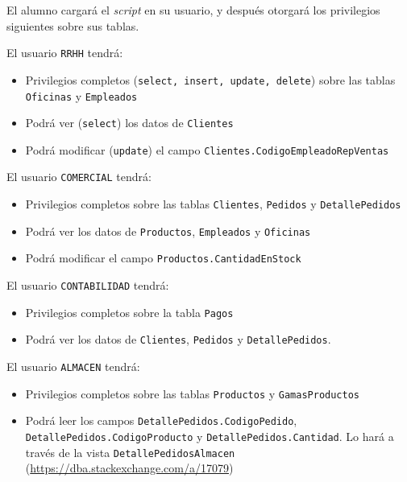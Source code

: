 El alumno cargará el \textit{script} en su usuario, y después otorgará los privilegios siguientes sobre sus tablas.

\begin{homeworkProblem}
  El usuario \texttt{RRHH} tendrá:
  \begin{itemize}
  \item Privilegios completos (\texttt{select, insert, update, delete}) sobre las tablas \texttt{Oficinas} y \texttt{Empleados}
  \item Podrá ver (\texttt{select}) los datos de \texttt{Clientes}
  \item Podrá modificar (\texttt{update}) el campo \texttt{Clientes.CodigoEmpleadoRepVentas}
  \end{itemize}
\end{homeworkProblem}

\begin{homeworkProblem}
  El usuario \texttt{COMERCIAL} tendrá:
  \begin{itemize}
  \item Privilegios completos sobre las tablas \texttt{Clientes}, \texttt{Pedidos} y \texttt{DetallePedidos}
  \item Podrá ver  los datos de \texttt{Productos}, \texttt{Empleados} y \texttt{Oficinas} 
  \item Podrá modificar el campo \texttt{Productos.CantidadEnStock}
  \end{itemize}
\end{homeworkProblem}

\begin{homeworkProblem}
  El usuario \texttt{CONTABILIDAD} tendrá:
  \begin{itemize}
  \item Privilegios completos sobre la tabla \texttt{Pagos}
  \item Podrá ver  los datos de \texttt{Clientes}, \texttt{Pedidos} y \texttt{DetallePedidos}.
  \end{itemize}
\end{homeworkProblem}

\begin{homeworkProblem}
  El usuario \texttt{ALMACEN} tendrá:
  \begin{itemize}
  \item Privilegios completos sobre las tablas \texttt{Productos} y \texttt{GamasProductos}
  \item Podrá leer los campos \texttt{DetallePedidos.CodigoPedido}, \texttt{DetallePedidos.CodigoProducto} y \texttt{DetallePedidos.Cantidad}. Lo hará a través de la vista \texttt{DetallePedidosAlmacen} (\url{https://dba.stackexchange.com/a/17079})
  \end{itemize}
\end{homeworkProblem}


